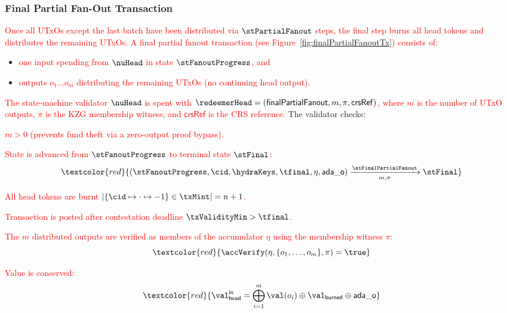 \subsubsection{Final Partial Fan-Out Transaction}\label{sec:final-partial-fanout-tx}

\textcolor{red}{Once all UTxOs except the last batch have been distributed via $\stPartialFanout$ steps,
the final step burns all head tokens and distributes the remaining UTxOs.
A final partial fanout transaction (see Figure~\ref{fig:finalPartialFanoutTx}) consists of:}
\begin{itemize}
  \item \textcolor{red}{one input spending from $\nuHead$ in state $\stFanoutProgress$, and}
  \item \textcolor{red}{outputs $o_{1} \dots o_{m}$ distributing the remaining UTxOs (no continuing head output).}
\end{itemize}

\noindent \textcolor{red}{The state-machine validator $\nuHead$ is spent with
$\redeemerHead = (\mathsf{finalPartialFanout}, m, \pi, \mathsf{crsRef})$, where $m$ is the number of UTxO outputs, $\pi$ is the KZG membership witness, and $\mathsf{crsRef}$ is the CRS reference.}
The validator checks:
\begin{menumerate}
  \item \textcolor{red}{$m > 0$ (prevents fund theft via a zero-output proof bypass).}
  \item \textcolor{red}{State is advanced from $\stFanoutProgress$ to terminal state $\stFinal$:}
  \[
	\textcolor{red}{(\stFanoutProgress,\cid,\hydraKeys,\tfinal,\eta,\mathsf{ada\_o}) \xrightarrow[m,\pi]{\stFinalPartialFanout} \stFinal}
  \]
  \item \textcolor{red}{All head tokens are burnt
  $|\{\cid \mapsto \cdot \mapsto -1\} \in \txMint| = n + 1$.}
  \item \textcolor{red}{Transaction is posted after contestation deadline $\txValidityMin > \tfinal$.}
  \item \textcolor{red}{The $m$ distributed outputs are verified as members of the accumulator $\eta$ using the membership witness $\pi$:}
  \[
	\textcolor{red}{\accVerify(\eta, \{o_1, \ldots, o_m\}, \pi) = \true}
  \]
  \item \textcolor{red}{Value is conserved:}
  \[
    \textcolor{red}{\val_{\mathsf{head}}^{\mathsf{in}} = \bigoplus_{i=1}^{m} \val(o_i) \oplus \val_{\mathsf{burned}} \oplus \mathsf{ada\_o}}
  \]
\end{menumerate}

